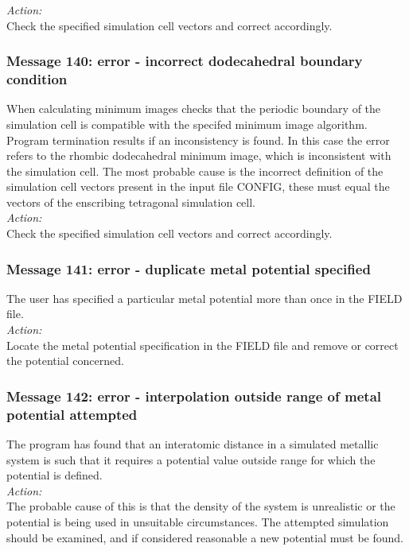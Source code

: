 \noindent
{\em Action:} \\ 
Check the specified simulation cell vectors and correct accordingly.

\subsubsection*{Message 140: error - incorrect dodecahedral boundary condition}

When calculating minimum images \D{} checks that the periodic
boundary of the simulation cell is compatible with the specifed
minimum image algorithm. Program termination results if an
inconsistency is found. In this case the error refers to the rhombic
dodecahedral minimum image, which is inconsistent with the simulation
cell. The most probable cause is the incorrect definition of the
simulation cell vectors present in the input file CONFIG, these must
equal the vectors of the enscribing tetragonal simulation cell. \\ 

\noindent
{\em Action:} \\ 
Check the specified simulation cell vectors and correct accordingly.

\subsubsection*{Message 141: error - duplicate metal potential specified}

The user has specified a particular metal potential more than once in
the FIELD file. \\

\noindent
{\em Action:} \\ 
Locate the metal potential specification in the FIELD file and remove
or correct the potential concerned. \\

\subsubsection*{Message 142: error - interpolation outside range of 
metal potential attempted}

The program has found that an interatomic distance in a simulated metallic
system is such that it requires a potential value outside range for which the
potential is defined. \\

\noindent
{\em Action:} \\ 
The probable cause of this is that the density of the system is unrealistic or
the potential is being used in unsuitable circumstances. The attempted
simulation should be examined, and if considered reasonable a new potential
must be found. \\

